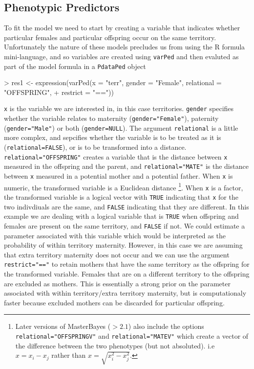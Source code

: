 \documentclass{article}
\begin{document}
\subsection{Phenotypic Predictors}
\label{pred-sec}

 To fit the model we need to start by creating a variable that indicates whether particular females and particular offspring occur on the same territory.  Unfortunately the nature of these models precludes us from using the R formula mini-language,  and so variables are created using \texttt{varPed} and then evaluted as part of the model formula in a \texttt{PdataPed} object

\begin{Schunk}
\begin{Sinput}
> res1 <- expression(varPed(x = "terr", gender = "Female", relational = "OFFSPRING", 
+     restrict = "=="))
\end{Sinput}
\end{Schunk}

\texttt{x} is the variable we are interested in, in this case territories.  \texttt{gender} specifies whether the variable relates to maternity (\texttt{gender="Female"}), paternity (\texttt{gender="Male"}) or both (\texttt{gender=NULL}). The argument \texttt{relational} is a little more complex, and sepcifies whether the variable is to be treated as it is (\texttt{relational=FALSE}), or is to be transformed into a distance.  \texttt{relational="OFFSPRING"} creates a variable that is the distance between \texttt{x} measured in the offspring and the parent, and \texttt{relational="MATE"} is the distance between \texttt{x} measured in a potential mother and a potential father.  When \texttt{x} is numeric, the transformed variable is a Euclidean distance \footnote{Later versions of MasterBayes ($>2.1$) also include the options \texttt{relational="OFFSPRINGV"} and \texttt{relational="MATEV"} which create a vector of the difference between the two phenotypes (but not absoluted). i.e $x=x_{i}-x_{j}$ rather than $x=\sqrt{x^{2}_{i}-x^{2}_{j}}$.}. When \texttt{x} is a factor, the transformed variable is a logical vector with \texttt{TRUE} indicating that \texttt{x} for the two indivdiuals are the same, and \texttt{FALSE} indicating that they are different.  In this example we are dealing with a logical variable that is \texttt{TRUE} when offspring and females are present on the same territory, and \texttt{FALSE} if not. We could estimate a parameter associated with this variable which would be interpreted as the probability of within territory maternity.  However, in this case we are assuming that extra territory maternity does not occur and we can use the argument \texttt{restrict="=="} to retain mothers that have the same territory as the offspring for the transformed variable. Females that are on a different territory to the offspring are excluded as mothers. This is essentially a strong prior on the parameter associated with within territory/extra territory maternity, but is computationaly faster because excluded mothers can be discarded for particular offspring.\\
\end{document}
